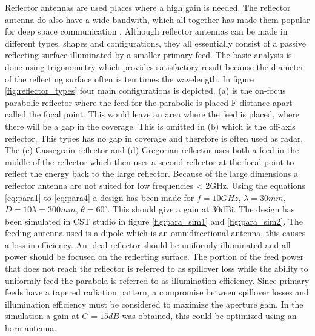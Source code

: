 Reflector antennas are used places where a high gain is needed. The reflector antenna do also have a wide bandwith, which all together has made them popular for deep space communication \citep{Imbriale2012}. Although reflector antennas can be made in different types, shapes and configurations, they all essentially consist of a passive reflecting surface illuminated by a smaller primary feed. The basic analysis is done using trigonometry which provides satisfactory result because the diameter of the reflecting surface often is ten times the wavelength. In figure \ref{fig:reflector_types} four main configurations is depicted. (a) is the on-focus parabolic reflector where the feed for the parabolic is placed F distance apart called the focal point. This would leave an area where the feed is placed, where there will be a gap in the coverage. This is omitted in (b) which is the off-axis reflector. This types has no gap in coverage and therefore is often used as radar. The (c) Cassegrain reflector and (d) Gregorian reflector uses both a feed in the middle of the reflector which then uses a second reflector at the focal point to reflect the energy back to the large reflector. Because of the large dimensions a reflector antenna are not suited for low frequencies < 2GHz. Using the equations \ref{eq:para1} to \ref{eq:para4} a design has been made for $f = 10GHz$, $\lambda = 30mm$, $D = 10\lambda = 300mm$, $\theta = 60^{\circ}$. This should give a gain at 30dBi. The design has been simulated in CST studio in figure \ref{fig:para_sim1} and \ref{fig:para_sim2}. The feeding antenna used is a dipole which is an omnidirectional antenna, this causes a loss in efficiency. An ideal reflector should be uniformly illuminated and all power should
be focused on the reflecting surface. The portion of the feed power that does not reach the reflector is referred to
as spillover loss while the ability to uniformly feed the parabola is referred to as illumination efficiency. Since
primary feeds have a tapered radiation pattern, a compromise between spillover losses and illumination
efficiency must be considered to maximize the aperture gain. In the simulation a gain at $G=15dB$ was obtained, this could be optimized using an horn-antenna. 

